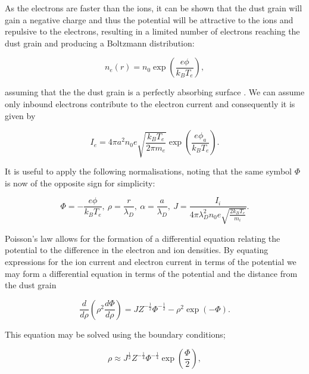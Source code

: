 \documentclass[journal]{Imperial_lab_report}
\begin{document}
As the electrons are faster than the ions, it can be shown that the dust grain will gain a negative charge and thus the potential will be attractive to the ions and repulsive to the electrons, resulting in a limited number of electrons reaching the dust grain and producing a Boltzmann distribution:  

\smallskip

\begin{equation}\label{eq:ABRed}
{n_e(r) = n_0 \exp{\left(\frac{e\phi}{k_B T_e}\right)}},
\end{equation}

assuming that the the dust grain is a perfectly absorbing surface \cite{ABR}. We can assume only inbound electrons contribute to the electron current and consequently it is given by

\begin{equation}\label{eq:ABRIe}
{I_e = 4 \pi a^2 n_0 e \sqrt{\frac{k_B T_e}{2 \pi m_e }} \exp{\left(\frac{e \phi_a}{k_B T_e}\right)}}.
\end{equation}  

It is useful to apply the following normalisations, noting that the same symbol $\Phi$ is now of the opposite sign for simplicity:

\begin{equation}\label{eq:ABRnorm}
{\Phi = - \frac{e\phi}{k_B T_e}}, \ {\rho = \frac{r}{\lambda_D}},\ {\alpha = \frac{a}{\lambda_D}},\ {J = \frac{I_i}{4 \pi \lambda_D^2 n_0 e \sqrt{\frac{2k_B T_e}{m_i}}}}.
\end{equation}

Poisson’s law allows for the formation of a differential equation relating the potential to the difference in the electron and ion densities. By equating expressions for the ion current and electron current in terms of the potential we may form a differential equation in terms of the potential and the distance from the dust grain \cite{ABR}

\begin{equation}\label{eq:ABR9} 
{\frac{d}{d\rho} \left(\rho^2 \frac{d\Phi}{d\rho}\right) = J Z^{-\frac{1}{2}}\Phi^{-\frac{1}{2}}  - \rho^2 \exp{(-\Phi)}}.
 \end{equation}
 
\noindent This equation may be solved using the boundary conditions;

\begin{equation}\label{eq:ABR10}
{ \rho \approx J^{\frac{1}{2}} Z^{-\frac{1}{4}} \Phi^{-\frac{1}{4}} \exp{\left(\frac{\Phi}{2}\right)}},
 \end{equation}
 
\end{document}
